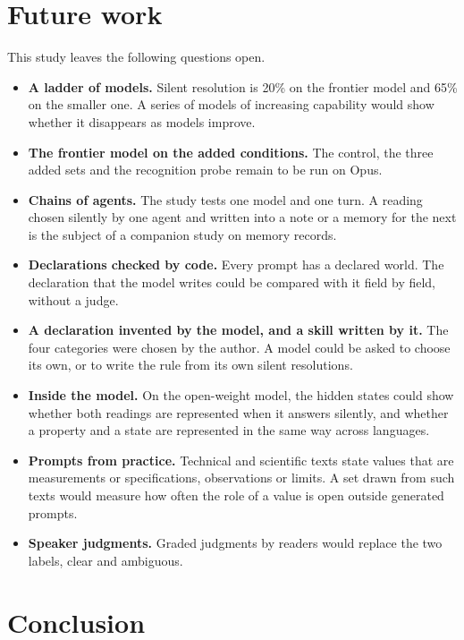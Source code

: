 \documentclass[11pt,a4paper]{article}
\begin{document}
\section{Future work}

This study leaves the following questions open.

\begin{itemize}\setlength\itemsep{2pt}
\item \textbf{A ladder of models.} Silent resolution is 20\% on the
frontier model and 65\% on the smaller one. A series of models of
increasing capability would show whether it disappears as models improve.
\item \textbf{The frontier model on the added conditions.} The control,
the three added sets and the recognition probe remain to be run on Opus.
\item \textbf{Chains of agents.} The study tests one model and one turn. A
reading chosen silently by one agent and written into a note or a memory
for the next is the subject of a companion study on memory records.
\item \textbf{Declarations checked by code.} Every prompt has a declared
world. The declaration that the model writes could be compared with it
field by field, without a judge.
\item \textbf{A declaration invented by the model, and a skill written by
it.} The four categories were chosen by the author. A model could be asked
to choose its own, or to write the rule from its own silent resolutions.
\item \textbf{Inside the model.} On the open-weight model, the hidden
states could show whether both readings are represented when it answers
silently, and whether a property and a state are represented in the same
way across languages.
\item \textbf{Prompts from practice.} Technical and scientific texts state
values that are measurements or specifications, observations or limits. A
set drawn from such texts would measure how often the role of a value is
open outside generated prompts.
\item \textbf{Speaker judgments.} Graded judgments by readers would replace
the two labels, clear and ambiguous.
\end{itemize}

\section{Conclusion}
\end{document}
